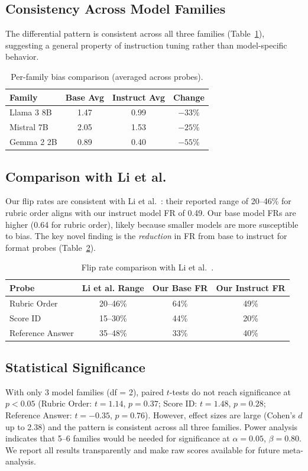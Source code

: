 \documentclass[11pt,twocolumn]{article}
\begin{document}
\subsection{Consistency Across Model Families}
The differential pattern is consistent across all three families (Table~\ref{tab:families}), suggesting a general property of instruction tuning rather than model-specific behavior.

\begin{table}[h]
\centering\small
\caption{Per-family bias comparison (averaged across probes).}
\label{tab:families}
\begin{tabular}{lccc}
\toprule
Family & Base Avg & Instruct Avg & Change \\
\midrule
Llama 3 8B & 1.47 & 0.99 & $-33\%$ \\
Mistral 7B & 2.05 & 1.53 & $-25\%$ \\
Gemma 2 2B & 0.89 & 0.40 & $-55\%$ \\
\bottomrule
\end{tabular}
\end{table}

\subsection{Comparison with Li et al.}
Our flip rates are consistent with Li et al.~\cite{li2025scoring}: their reported range of 20--46\% for rubric order aligns with our instruct model FR of 0.49. Our base model FRs are higher (0.64 for rubric order), likely because smaller models are more susceptible to bias. The key novel finding is the \emph{reduction} in FR from base to instruct for format probes (Table~\ref{tab:compare}).

\begin{table}[h]
\centering\small
\caption{Flip rate comparison with Li et al.~\cite{li2025scoring}.}
\label{tab:compare}
\begin{tabular}{lccc}
\toprule
Probe & Li et al. Range & Our Base FR & Our Instruct FR \\
\midrule
Rubric Order & 20--46\% & 64\% & 49\% \\
Score ID & 15--30\% & 44\% & 20\% \\
Reference Answer & 35--48\% & 33\% & 40\% \\
\bottomrule
\end{tabular}
\end{table}

\subsection{Statistical Significance}
With only 3 model families (df = 2), paired $t$-tests do not reach significance at $p < 0.05$ (Rubric Order: $t = 1.14$, $p = 0.37$; Score ID: $t = 1.48$, $p = 0.28$; Reference Answer: $t = -0.35$, $p = 0.76$). However, effect sizes are large (Cohen's $d$ up to 2.38) and the pattern is consistent across all three families. Power analysis indicates that 5--6 families would be needed for significance at $\alpha = 0.05$, $\beta = 0.80$. We report all results transparently and make raw scores available for future meta-analysis.
\end{document}
